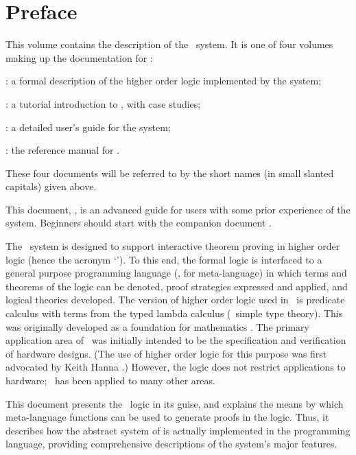 \chapter*{Preface}
\label{intro}

This volume contains the  description of  the \HOL\  system.
It is one of four volumes making up the documentation for \HOL:

\begin{myenumerate}
\item \LOGIC: a formal description of the higher order logic
  implemented by the \HOL{} system;
\item \TUTORIAL: a tutorial introduction to \HOL, with case studies;
\item \DESCRIPTION: a detailed user's guide for the \HOL{} system;
\item \REFERENCE: the reference manual for \HOL.
\end{myenumerate}

\noindent These four documents will be referred to by the short names (in
small slanted capitals) given above.

This document, \DESCRIPTION, is an advanced guide for users with some
prior experience of the system.  Beginners should start with the
companion document \TUTORIAL.

The \HOL\ system is designed to support interactive theorem proving in
higher order logic (hence the acronym `\HOL').  To this end, the formal
logic is interfaced to a general purpose programming language (\ML, for
meta-language) in which terms and theorems of the logic can be denoted,
proof strategies expressed and applied, and logical theories developed.
The version of higher order logic used in \HOL\ is predicate calculus
with terms from the typed lambda calculus (\ie\ simple type
theory). This was originally developed as a foundation for mathematics
\cite{Church}.  The primary application area of \HOL\ was initially
intended to be the specification and verification of hardware designs.
(The use of higher order logic for this purpose was first advocated by
Keith Hanna \cite{Hanna-Daeche}.)  However, the logic does not restrict
applications to hardware; \HOL\ has been applied to many other areas.

This document presents the \HOL\ logic in its \ML{} guise, and
explains the means by which meta-language functions can be used to
generate proofs in the logic.  Thus, it describes how the abstract
system of \LOGIC{} is actually implemented in the \ML{} programming
language, providing comprehensive descriptions of the system's major
features.

